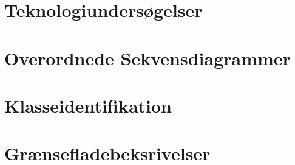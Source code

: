 \newpage
\section{Teknologiundersøgelser}


\newpage
\section{Overordnede Sekvensdiagrammer}


\newpage
\section{Klasseidentifikation}


\newpage
\section{Grænsefladebeksrivelser}
